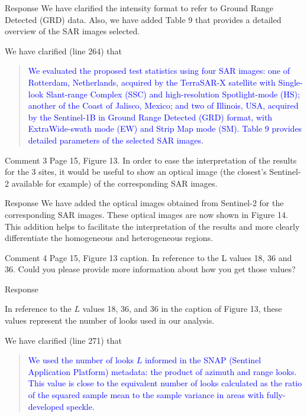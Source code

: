 \documentclass[11pt]{report}
\begin{document}
\begin{responsebox}{Response}
We have clarified the intensity format to refer to Ground Range Detected (GRD) data. Also, we have added Table 9 that provides a detailed overview of the SAR images selected.

We have clarified (line 264) that
\begin{quote}
	\textcolor{blue}{
	We evaluated the proposed test statistics using four SAR images: one of Rotterdam, 
Netherlands, acquired by the TerraSAR-X satellite with Single-look Slant-range Complex 
(SSC) and high-resolution Spotlight-mode (HS); another of the Coast of Jalisco, Mexico; and
two of Illinois, USA, acquired by the Sentinel-1B in Ground Range Detected (GRD) format, 
with ExtraWide-swath mode (EW) and Strip Map mode (SM). Table 9 provides detailed
parameters of the selected SAR images.
}
\end{quote}
\end{responsebox}

\vspace{3em}
\begin{reviewbox}{Comment 3}
Page 15, Figure 13. In order to ease the interpretation of the results for the 3 sites, it would be useful to show an optical image (the closest's Sentinel-2 available for example) of the corresponding SAR images.
\end{reviewbox}
\begin{responsebox}{Response}
	We have added the optical images obtained from Sentinel-2 for the corresponding SAR images. These optical images are now shown in Figure 14. This addition helps to facilitate the interpretation of the results and more clearly differentiate the homogeneous and heterogeneous regions.
\end{responsebox}

\vspace{3em}
\begin{reviewbox}{Comment 4}
Page 15, Figure 13 caption. In reference to the L values 18, 36 and 36. Could you please provide more information about how you get those values?
\end{reviewbox}
\begin{responsebox}{Response}

In reference to the $L$ values 18, 36, and 36 in the caption of Figure 13, these values represent the number of looks used in our analysis. 

We have clarified (line 271) that
\begin{quote}
	\textcolor{blue}{
We used the number of looks $L$ informed in the SNAP (Sentinel Application Platform) metadata: the product of azimuth and range looks. 
This value is close to the equivalent number of looks calculated as the ratio of the squared sample mean to the sample variance in areas with fully-developed speckle.
}
\end{quote}
\end{responsebox}
\end{document}
